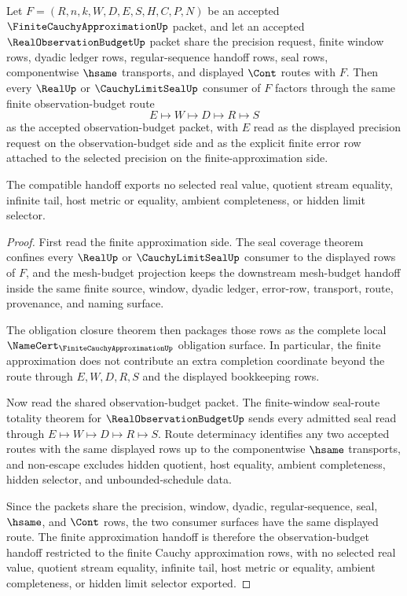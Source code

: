 \begin{theorem}
\label{thm:finite-cauchy-approximation-observation-budget-compatibility}
Let $F=(R,n,k,W,D,E,S,H,C,P,N)$ be an accepted $\FiniteCauchyApproximationUp$ packet, and let an accepted $\RealObservationBudgetUp$ packet share the precision request, finite window rows, dyadic ledger rows, regular-sequence handoff rows, seal rows, componentwise $\hsame$ transports, and displayed $\Cont$ routes with $F$. Then every $\RealUp$ or $\CauchyLimitSealUp$ consumer of $F$ factors through the same finite observation-budget route
$$
E \longmapsto W \longmapsto D \longmapsto R \longmapsto S
$$
as the accepted observation-budget packet, with $E$ read as the displayed precision request on the observation-budget side and as the explicit finite error row attached to the selected precision on the finite-approximation side.

The compatible handoff exports no selected real value, quotient stream equality, infinite tail, host metric or equality, ambient completeness, or hidden limit selector.
\end{theorem}
\begin{proof}
First read the finite approximation side. The seal coverage theorem confines every $\RealUp$ or $\CauchyLimitSealUp$ consumer to the displayed rows of $F$, and the mesh-budget projection keeps the downstream mesh-budget handoff inside the same finite source, window, dyadic ledger, error-row, transport, route, provenance, and naming surface.

The obligation closure theorem then packages those rows as the complete local $\NameCert_{\FiniteCauchyApproximationUp}$ obligation surface. In particular, the finite approximation does not contribute an extra completion coordinate beyond the route through $E,W,D,R,S$ and the displayed bookkeeping rows.

Now read the shared observation-budget packet. The finite-window seal-route totality theorem for $\RealObservationBudgetUp$ sends every admitted seal read through $E \longmapsto W \longmapsto D \longmapsto R \longmapsto S$. Route determinacy identifies any two accepted routes with the same displayed rows up to the componentwise $\hsame$ transports, and non-escape excludes hidden quotient, host equality, ambient completeness, hidden selector, and unbounded-schedule data.

Since the packets share the precision, window, dyadic, regular-sequence, seal, $\hsame$, and $\Cont$ rows, the two consumer surfaces have the same displayed route. The finite approximation handoff is therefore the observation-budget handoff restricted to the finite Cauchy approximation rows, with no selected real value, quotient stream equality, infinite tail, host metric or equality, ambient completeness, or hidden limit selector exported.
\end{proof}

